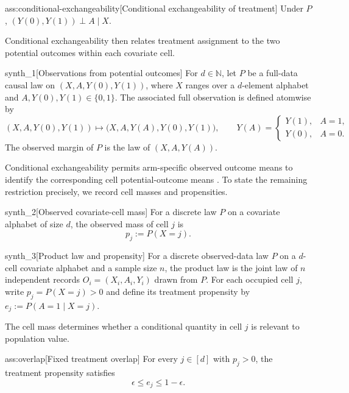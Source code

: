 \begin{assumptionv}{ass:conditional-exchangeability}[Conditional exchangeability of treatment]
Under \(P\), \((Y(0),Y(1))\perp A\mid X\).
\end{assumptionv}

Conditional exchangeability then relates treatment assignment to the two potential outcomes within each covariate cell.

\begin{definitionv}{synth_1}[Observations from potential outcomes]
For \(d\in\mathbb N\), let \(P\) be a full-data causal law on \((X,A,Y(0),Y(1))\), where \(X\) ranges over a \(d\)-element alphabet and \(A,Y(0),Y(1)\in\{0,1\}\). The associated full observation is defined atomwise by
\[
(X,A,Y(0),Y(1))\longmapsto
\bigl(X,A,Y(A),Y(0),Y(1)\bigr),
\qquad
Y(A)=
\begin{cases}
Y(1),& A=1,\\
Y(0),& A=0.
\end{cases}
\]
The observed margin of \(P\) is the law of \((X,A,Y(A))\).
\end{definitionv}

Conditional exchangeability permits arm-specific observed outcome means to identify the corresponding cell potential-outcome means \citep{RosenbaumRubin1983}. To state the remaining restriction precisely, we record cell masses and propensities.

\begin{definitionv}{synth_2}[Observed covariate-cell mass]
For a discrete law \(P\) on a covariate alphabet of size \(d\), the observed mass of cell \(j\) is
\[
p_j := P(X=j).
\]
\end{definitionv}

\begin{definitionv}{synth_3}[Product law and propensity]
For a discrete observed-data law \(P\) on a \(d\)-cell covariate alphabet and a sample size \(n\), the product law is the joint law of \(n\) independent records \(O_i=(X_i,A_i,Y_i)\) drawn from \(P\). For each occupied cell \(j\), write \(p_j=P(X=j)>0\) and define its treatment propensity by \(e_j:=P(A=1\mid X=j)\).
\end{definitionv}

The cell mass  determines whether a conditional quantity in cell \(j\) is relevant to population value.

\begin{assumptionv}{ass:overlap}[Fixed treatment overlap]
For every \(j\in[d]\) with \(p_j>0\), the treatment propensity satisfies
\[
\epsilon\le e_j\le 1-\epsilon.
\]
\end{assumptionv}

